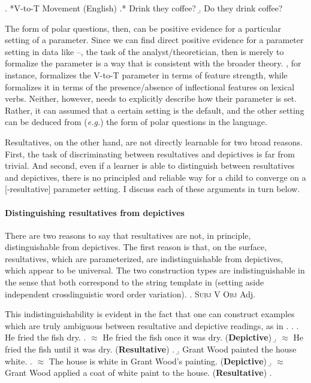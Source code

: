 \documentclass[MilwayThesis]{subfiles}
\begin{document}
\ex. *V-to-T Movement (English)
\a.* Drink they coffee?
\b. Do they drink coffee?

The form of polar questions, then, can be positive evidence for a particular setting of a parameter.
Since we can find direct positive evidence for a parameter setting in data like \LLast--\Last, the task of the analyst/theoretician, then is merely to formalize the parameter is a way that is consistent with the broader theory.
\textcite{chomsky1995minimalist}, for instance, formalizes the V-to-T parameter in terms of feature strength, while \textcite{lasnik1999verbal} formalizes it in terms of the presence/absence of inflectional features on lexical verbs.
Neither, however, needs to explicitly describe how their parameter is set.
Rather, it can assumed that a certain setting is the default, and the other setting can be deduced from (\textit{e.g.}) the form of polar questions in the language.

Resultatives, on the other hand, are not directly learnable for two broad reasons.
First, the task of discriminating between resultatives and depictives is far from trivial.
And second, even if a learner is able to distinguish between resultatives and depictives, there is no principled and reliable way for a child to converge on a [-resultative] parameter setting.
I discuss each of these arguments in turn below.

\paragraph{Distinguishing resultatives from depictives}
There are two reasons to say that resultatives are not, in principle, distinguishable from depictives.
The first reason is that, on the surface, resultatives, which are parameterized, are indistinguishable from depictives, which appear to be universal.
The two construction types are indistinguishable in the sense that both correspond to the string template in \Next (setting aside independent crosslinguistic word order variation).
\ex. \textsc{Subj} V \textsc{Obj} Adj.

This indistinguishability is evident in the fact that one can construct examples which are truly ambiguous between resultative and depictive readings, as in \Next.
\ex. 
\a. He fried the fish dry.
\a. $\approx$ He fried the fish once it was dry. (\textbf{Depictive})
\b. $\approx$ He fried the fish until it was dry. (\textbf{Resultative})
\z.
\b. Grant Wood painted the house white.
\a. $\approx$ The house is white in Grant Wood's painting. (\textbf{Depictive})
\b. $\approx$ Grant Wood applied a coat of white paint to the house. (\textbf{Resultative})
\z.
\end{document}
